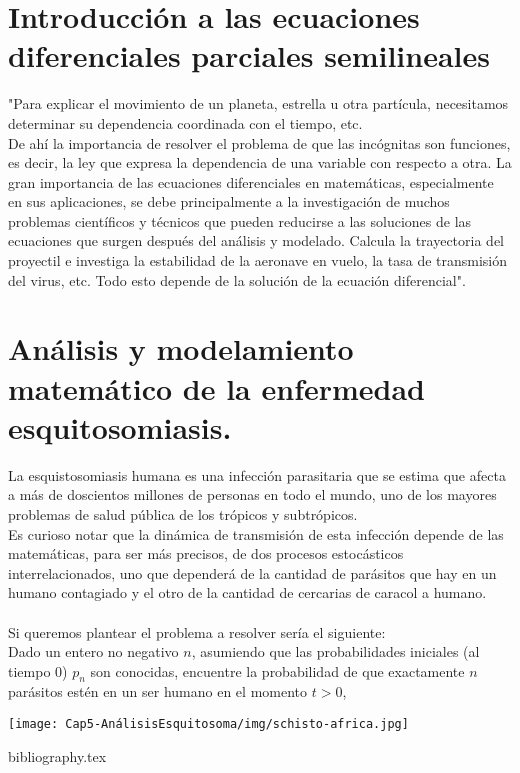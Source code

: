 \documentclass[a4paper,11pt]{book}
\begin{document}
\chapter{Introducción a las ecuaciones diferenciales parciales semilineales}

"Para explicar el movimiento de un planeta, estrella u otra partícula, necesitamos determinar su dependencia coordinada con el tiempo, etc.\\ De ahí la importancia de resolver el problema de que las incógnitas son funciones, es decir, la ley que expresa la dependencia de una variable con respecto a otra. La gran importancia de las ecuaciones diferenciales en matemáticas, especialmente en sus aplicaciones, se debe principalmente a la investigación de muchos problemas científicos y técnicos que pueden reducirse a las soluciones de las ecuaciones que surgen después del análisis y modelado. Calcula la trayectoria del proyectil e investiga la estabilidad de la aeronave en vuelo, la tasa de transmisión del virus, etc. Todo esto depende de la solución de la ecuación diferencial".

    
    
    
    
 \chapter{Análisis y modelamiento matemático de la enfermedad esquitosomiasis.}   
La esquistosomiasis humana es una infección parasitaria que se estima que afecta a m\'as de doscientos millones de personas en todo el mundo, uno de los mayores problemas de salud pública de los trópicos y subtrópicos.\\
Es curioso notar que la dinámica de transmisión de esta infección depende de las matemáticas, para ser más precisos, de dos procesos estocásticos interrelacionados, uno que dependerá de la cantidad de parásitos que hay en un humano contagiado y el otro de la cantidad de cercarias de caracol a humano.\\\\
Si queremos plantear el problema a resolver sería el siguiente:\\
Dado un entero no negativo $n$, asumiendo que las probabilidades iniciales (al tiempo 0) $p_n$ son conocidas, encuentre la probabilidad de que exactamente $n$ parásitos estén en un ser humano en el momento $t>0$,
\begin{center}
\texttt{[image: Cap5-AnálisisEsquitosoma/img/schisto-africa.jpg]}
\end{center}
    
    
    
    

\backmatter

{bibliography.tex}
\end{document}
